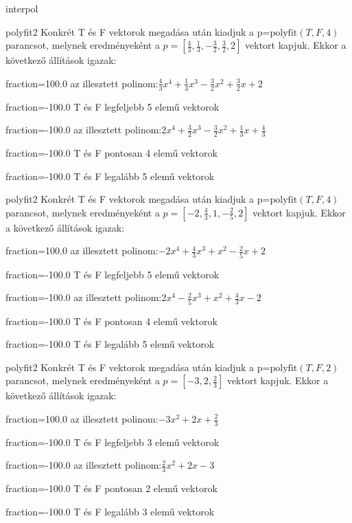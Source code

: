 \documentclass[12pt]{article}
\begin{document}
\begin{quiz}{interpol}
\begin{multi}[multiple]{polyfit2}
Konkrét T és F vektorok megadása után kiadjuk a p=$\mathrm{polyfit}(T,F,4)$
parancsot, melynek eredményeként a $p=\left[\frac{4}{3},\frac{1}{3},-\frac{3}{2},\frac{3}{2},2\right]$ vektort kapjuk.
Ekkor a következő állítások igazak:
\item[fraction=100.0] az illesztett polinom:$\frac{4}{3}x^4+\frac{1}{3}x^3-\frac{3}{2}x^2+\frac{3}{2}x+2$
\item[fraction=-100.0]  T és F legfeljebb 5 elemű vektorok
\item[fraction=-100.0]  az illesztett polinom:$2x^4+\frac{3}{2}x^3-\frac{3}{2}x^2+\frac{1}{3}x+\frac{4}{3}$
\item[fraction=-100.0]  T és F pontosan 4 elemű vektorok
\item[fraction=-100.0] T és F legalább 5 elemű vektorok
\end{multi}
\begin{multi}[multiple]{polyfit2}
Konkrét T és F vektorok megadása után kiadjuk a p=$\mathrm{polyfit}(T,F,4)$
parancsot, melynek eredményeként a $p=\left[-2,\frac{4}{3},1,-\frac{2}{5},2\right]$ vektort kapjuk.
Ekkor a következő állítások igazak:
\item[fraction=100.0] az illesztett polinom:$-2x^4+\frac{4}{3}x^3+x^2-\frac{2}{5}x+2$
\item[fraction=-100.0]  T és F legfeljebb 5 elemű vektorok
\item[fraction=-100.0]  az illesztett polinom:$2x^4-\frac{2}{5}x^3+x^2+\frac{4}{3}x-2$
\item[fraction=-100.0]  T és F pontosan 4 elemű vektorok
\item[fraction=-100.0] T és F legalább 5 elemű vektorok
\end{multi}
\begin{multi}[multiple]{polyfit2}
Konkrét T és F vektorok megadása után kiadjuk a p=$\mathrm{polyfit}(T,F,2)$
parancsot, melynek eredményeként a $p=\left[-3,2,\frac{2}{3}\right]$ vektort kapjuk.
Ekkor a következő állítások igazak:
\item[fraction=100.0] az illesztett polinom:$-3x^2+2x+\frac{2}{3}$
\item[fraction=-100.0]  T és F legfeljebb 3 elemű vektorok
\item[fraction=-100.0]  az illesztett polinom:$\frac{2}{3}x^2+2x-3$
\item[fraction=-100.0]  T és F pontosan 2 elemű vektorok
\item[fraction=-100.0] T és F legalább 3 elemű vektorok

\end{multi}
\end{quiz}
\end{document}
